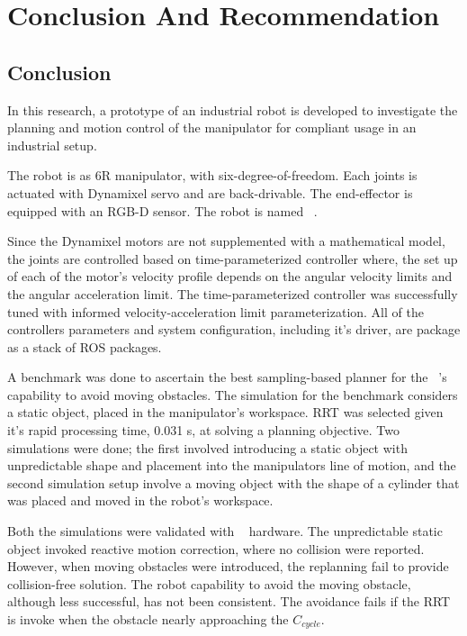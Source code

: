 
\chapter{Conclusion And Recommendation}
\label{chap:conclusion_recommendation}

\section{Conclusion}
    In this research, a prototype of an industrial robot is 
    developed to investigate the planning and motion control 
    of the manipulator for compliant usage in an industrial 
    setup.

    The robot is as 6R manipulator, with six-degree-of-freedom. Each joints is actuated 
    with Dynamixel servo and are back-drivable. The end-effector is equipped with 
    an RGB-D sensor. The robot is named \rimini~. 
    
    Since the Dynamixel motors are not supplemented with a mathematical model, the joints
    are controlled based on time-parameterized controller where, the set up of each of
    the motor's velocity profile depends on the angular velocity limits and the angular
    acceleration limit. The time-parameterized controller was successfully tuned with informed velocity-acceleration limit
    parameterization. All of the \rimini~   controllers
    parameters and system configuration, including it's driver, are package as 
    a stack of ROS packages.

A benchmark was done to ascertain the best sampling-based planner for the \rimini~'s 
capability to avoid moving obstacles. The simulation for the benchmark considers a
static object, placed in the manipulator's workspace. 
RRT was selected given it's
rapid processing time, 0.031 s, at solving a planning objective. 
Two simulations were done; the first involved  
introducing a static object with 
unpredictable shape and placement 
into the manipulators line of motion, and the second 
simulation setup involve a moving object with the shape of a cylinder that was placed and moved in the robot's workspace.

Both the simulations were validated with \rimini~ hardware. 
The unpredictable static object invoked reactive motion 
correction, where no collision were reported.  
However, when moving obstacles were introduced, the replanning
fail to provide collision-free solution. The robot capability to avoid the moving obstacle, although less successful,
has not been consistent. The avoidance fails if
the RRT is invoke when the obstacle nearly approaching the $C_{cycle}$.

